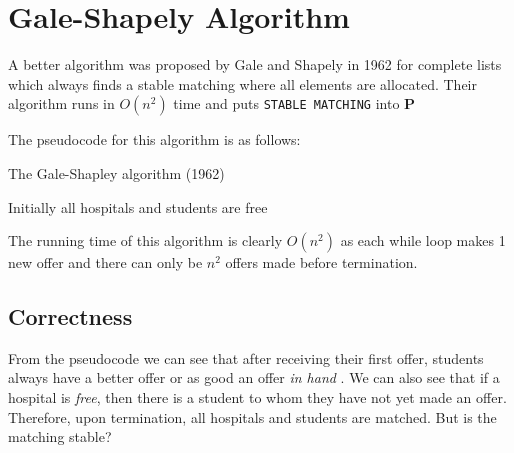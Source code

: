 \documentclass{article}
\renewcommand{\P}{\mathbf{P}}
\begin{document}
\section{Gale-Shapely Algorithm}

A better algorithm was proposed by Gale and Shapely in 1962 for complete lists which always finds a stable matching where all elements are allocated. Their algorithm runs in $O(n^{2})$ time and puts \texttt{STABLE MATCHING} into $\P$

The pseudocode for this algorithm is as follows:

\begin{algorithm}[H]
  \caption{The Gale-Shapley algorithm (1962)}
  \SetAlgoLined
  Initially all hospitals and students are free

\end{algorithm}

The running time of this algorithm is clearly $O(n^{2})$ as each while loop makes 1 new offer and there can only be $n^{2}$ offers made before termination.

\subsection{Correctness }

From the pseudocode we can see that after receiving their first offer, students always have a better offer or as good an offer \textit{in hand} . We can also see that if a hospital is \textit{free}, then there is a student to whom they have not yet made an offer. Therefore, upon termination, all hospitals and students are matched. But is the matching stable?
\end{document}
